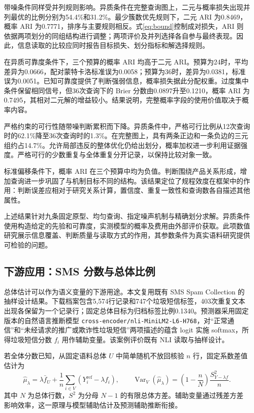 \documentclass[UTF8,a4paper,zihao=-4,fontset=fandol]{ctexart}
\newcommand{\Var}{\operatorname{Var}}
\begin{document}
带噪条件同样受并列规则影响。异质条件在完整查询图上，二元与概率损失出现并列最优的比例分别为54.4\%和31.2\%。最少簇数优先规则下，二元 ARI 为0.8469，概率 ARI 为0.7771，排序与主要规则相反。式\eqref{eq:bound}控制成对损失，ARI 则依据两项划分的同组结构进行调整；两项评价及并列选择各自参与最终表现。因此，信息读取的比较应同时报告目标损失、划分指标和解选择规则。

在异质可靠度条件下，三个预算的概率 ARI 均高于二元 ARI。预算为24时，平均差异为0.0666，配对蒙特卡洛标准误为0.0058；预算为36时，差异为0.0381，标准误为0.0051。已知可靠度提供了判断强弱信息，概率损失据此分配权重。过度集中条件保留相同信号，但36次查询下的 Brier 分数由0.0897升至0.1210，概率 ARI 为0.7495，其相对二元解的增益较小。结果说明，完整概率字段的使用价值取决于概率内容。

严格约束的可行性随带噪判断累积而下降。异质条件中，严格可行比例从12次查询时的62.1\%降至36次查询时的1.3\%。在完整图上，具有两条正边和一条负边的三元组约占14.7\%。允许局部违反的整体优化仍给出划分，概率加权进一步利用证据强度。严格可行的少数重复与全体重复分开记录，以保持比较对象一致。

标准偏移条件下，概率 ARI 在三个预算中均为负值。判断围绕产品关系形成，增加查询进一步巩固了与机制目标不同的结构。该结果定位了规程效度在框架中的作用：判断误差应相对于研究关系计算，置信度、重复一致性和查询数各自描述其他属性。

上述结果针对九条固定原型、均匀查询、指定噪声机制与精确划分求解。异质条件使用构造给定的先验和可靠度，实测模型的概率及费用由外部评价获取。此项数值研究展示信息覆盖、判断质量与读取方式的作用，其参数条件为真实语料研究提供可检验的问题。

\subsection{下游应用：SMS 分数与总体比例}\label{sec:sms}

总体估计可以作为语义变量的下游用途。本文复用既有 SMS Spam Collection 的抽样设计结果\citep{sms-data}。下载档案包含5,574行记录和747个垃圾短信标签，403次重复文本出现各保留为一个记录行；固定总体目标为归档标签比例0.1340。预测器采用固定版本的自然语言推断模型 \nolinkurl{cross-encoder/nli-MiniLM2-L6-H768}，对“正常通信”和“未经请求的推广或欺诈性垃圾短信”两项描述的蕴含 logit 实施 softmax，所得垃圾短信分数 $f_i$ 用作辅助变量\citep{sms-model}。该案例评价既有 NLI 读取与抽样设计。

若全体分数已知，从固定语料总体 $U$ 中简单随机不放回核验 $n$ 行，固定系数差值估计为
\begin{equation}
 \widehat\mu_\lambda=\lambda\bar f_U+
 \frac1n\sum_{i\in V}(Y_i^{\mathrm{ref}}-\lambda f_i),\qquad
 \Var_V(\widehat\mu_\lambda)=
 \left(1-\frac nN\right)\frac{S^2_{Y-\lambda f}}n.
 \label{eq:sms}
\end{equation}
其中 $N$ 为总体行数，$S^2$ 为分母 $N-1$ 的有限总体方差。辅助变量通过残差方差影响效率，这一原理与模型辅助估计及预测辅助推断衔接\citep{sarndal1992,ppi2023}。
\end{document}
